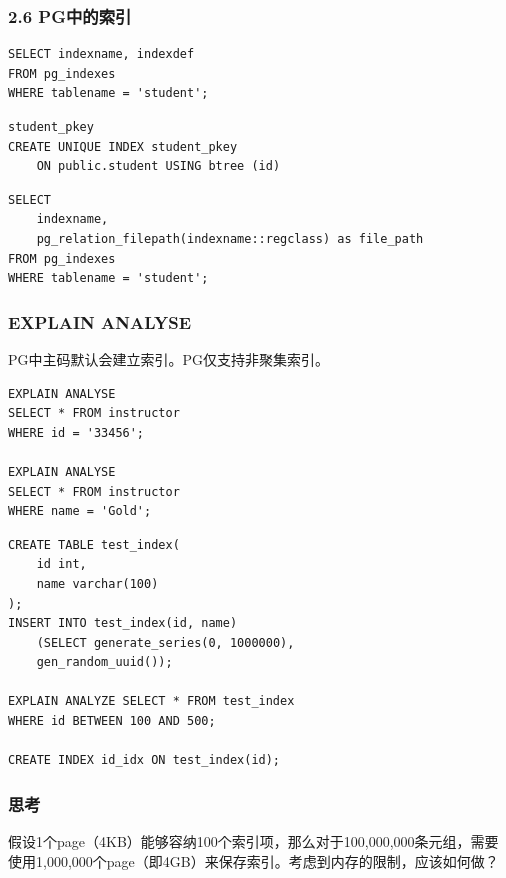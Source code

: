 \documentclass[aspectratio=169, 14pt]{beamer}
\begin{document}
\begin{frame}[fragile]
	\frametitle{2.6 PG中的索引}

	\begin{verbatim}
SELECT indexname, indexdef
FROM pg_indexes
WHERE tablename = 'student';
  \end{verbatim}

	\begin{verbatim}
student_pkey
CREATE UNIQUE INDEX student_pkey 
    ON public.student USING btree (id)
\end{verbatim}


	\begin{verbatim}
SELECT 
    indexname,
    pg_relation_filepath(indexname::regclass) as file_path
FROM pg_indexes 
WHERE tablename = 'student';
\end{verbatim}

\end{frame}

\begin{frame}[fragile]
	\frametitle{EXPLAIN ANALYSE}
	PG中主码默认会建立索引。PG仅支持非聚集索引。

	\begin{verbatim} 
EXPLAIN ANALYSE 
SELECT * FROM instructor
WHERE id = '33456';

EXPLAIN ANALYSE 
SELECT * FROM instructor
WHERE name = 'Gold';
\end{verbatim}
\end{frame}

\begin{frame}[fragile]
	\begin{verbatim} 
CREATE TABLE test_index(
    id int,
    name varchar(100)
);
INSERT INTO test_index(id, name)
    (SELECT generate_series(0, 1000000), 
    gen_random_uuid());

EXPLAIN ANALYZE SELECT * FROM test_index
WHERE id BETWEEN 100 AND 500;

CREATE INDEX id_idx ON test_index(id);
    \end{verbatim}


\end{frame}

\begin{frame}
	\frametitle{思考}
	假设1个page（4KB）能够容纳100个索引项，那么对于100,000,000条元组，需要使用1,000,000个page（即4GB）来保存索引。考虑到内存的限制，应该如何做？


\end{frame}
\end{document}
